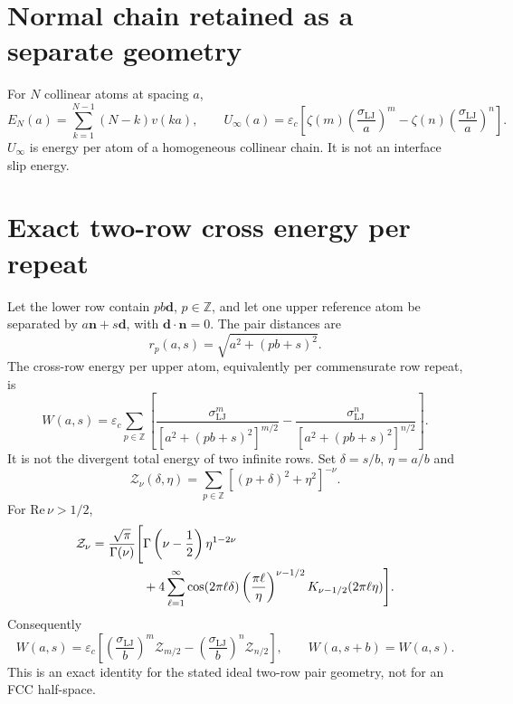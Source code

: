 \documentclass[11pt]{article}
\newcommand{\epsc}{\varepsilon_c}
\newcommand{\sigLJ}{\sigma_{\mathrm{LJ}}}
\begin{document}
\section{Normal chain retained as a separate geometry}

For $N$ collinear atoms at spacing $a$,
\begin{equation}
E_N(a)=\sum_{k=1}^{N-1}(N-k)v(ka),
\qquad
U_\infty(a)=\epsc\left[\zeta(m)\left(\frac{\sigLJ}{a}\right)^m
-\zeta(n)\left(\frac{\sigLJ}{a}\right)^n\right].
\end{equation}
$U_\infty$ is energy per atom of a homogeneous collinear chain. It is not an
interface slip energy.

\section{Exact two-row cross energy per repeat}

Let the lower row contain $pb\bm d$, $p\in\mathbb Z$, and let one upper
reference atom be separated by $a\bm n+s\bm d$, with
$\bm d\cdot\bm n=0$. The pair distances are
\begin{equation}
r_p(a,s)=\sqrt{a^2+(pb+s)^2}.
\end{equation}
The cross-row energy per upper atom, equivalently per commensurate row repeat,
is
\begin{equation}
W(a,s)=\epsc\sum_{p\in\mathbb Z}\left[
\frac{\sigLJ^m}{[a^2+(pb+s)^2]^{m/2}}
-\frac{\sigLJ^n}{[a^2+(pb+s)^2]^{n/2}}
\right].
\end{equation}
It is not the divergent total energy of two infinite rows. Set
$\delta=s/b$, $\eta=a/b$ and
\begin{equation}
\mathcal Z_\nu(\delta,\eta)=\sum_{p\in\mathbb Z}
[(p+\delta)^2+\eta^2]^{-\nu}.
\end{equation}
For $\mathrm{Re}\,\nu>1/2$,
\begin{equation}
\begin{aligned}
\mathcal Z_\nu={\sqrt\pi\over\Gamma(\nu)}\Bigg[
&\Gamma\left(\nu-\frac12\right)\eta^{1-2\nu}\\
&+4\sum_{\ell=1}^\infty\cos(2\pi\ell\delta)
\left(\frac{\pi\ell}{\eta}\right)^{\nu-1/2}
K_{\nu-1/2}(2\pi\ell\eta)\Bigg].
\end{aligned}
\end{equation}
Consequently
\begin{equation}
W(a,s)=\epsc\left[
\left(\frac{\sigLJ}{b}\right)^m\mathcal Z_{m/2}
-\left(\frac{\sigLJ}{b}\right)^n\mathcal Z_{n/2}\right],
\qquad W(a,s+b)=W(a,s).
\end{equation}
This is an exact identity for the stated ideal two-row pair geometry, not for
an FCC half-space.
\end{document}
